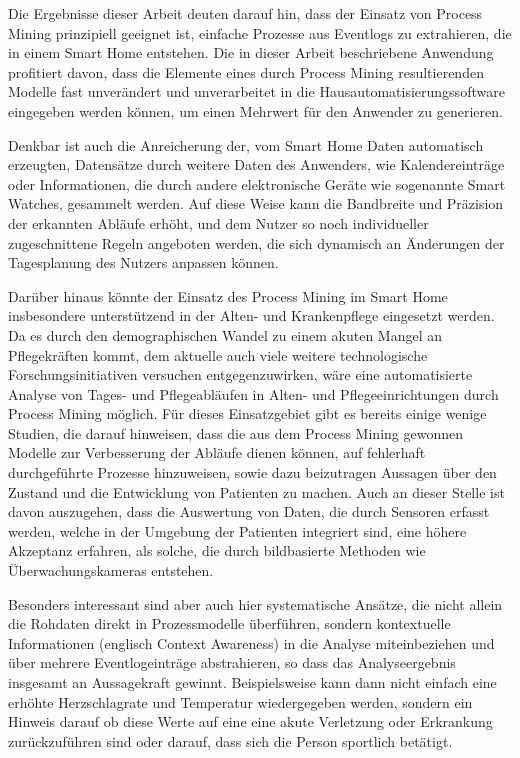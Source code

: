 Die Ergebnisse dieser Arbeit deuten darauf hin, dass der Einsatz von Process Mining prinzipiell geeignet ist, einfache Prozesse aus Eventlogs zu extrahieren, die in einem Smart Home entstehen. Die in dieser Arbeit beschriebene Anwendung profitiert davon, dass die Elemente eines durch Process Mining resultierenden Modelle fast unverändert und unverarbeitet in die Hausautomatisierungssoftware eingegeben werden können, um einen Mehrwert für den Anwender zu generieren. 

Denkbar ist auch die Anreicherung der, vom Smart Home Daten automatisch erzeugten, Datensätze durch weitere Daten des Anwenders, wie Kalendereinträge oder Informationen, die durch andere elektronische Geräte wie sogenannte Smart Watches, gesammelt werden. Auf diese Weise kann die Bandbreite und Präzision der erkannten Abläufe erhöht, und dem Nutzer so noch individueller zugeschnittene Regeln angeboten werden, die sich dynamisch an Änderungen der Tagesplanung des Nutzers anpassen können.

Darüber hinaus könnte der Einsatz des Process Mining im Smart Home insbesondere unterstützend in der Alten- und Krankenpflege eingesetzt werden. Da es durch den demographischen Wandel zu einem akuten Mangel an Pflegekräften kommt, dem aktuelle auch viele weitere technologische Forschungsinitiativen versuchen entgegenzuwirken, wäre eine automatisierte Analyse von Tages- und Pflegeabläufen in Alten- und Pflegeeinrichtungen durch Process Mining möglich. Für dieses Einsatzgebiet gibt es bereits einige wenige Studien, die darauf hinweisen, dass die aus dem Process Mining gewonnen Modelle zur Verbesserung der Abläufe dienen können, auf fehlerhaft durchgeführte Prozesse hinzuweisen, sowie dazu beizutragen Aussagen über den Zustand und die Entwicklung von Patienten zu machen. Auch an dieser Stelle ist davon auszugehen, dass die Auswertung von Daten, die durch Sensoren erfasst werden, welche in der Umgebung der Patienten integriert sind, eine höhere Akzeptanz erfahren, als solche, die durch bildbasierte Methoden wie Überwachungskameras entstehen.

Besonders interessant sind aber auch hier systematische Ansätze, die nicht allein die Rohdaten direkt in Prozessmodelle überführen, sondern kontextuelle Informationen (englisch Context Awareness) in die Analyse miteinbeziehen und über mehrere Eventlogeinträge abstrahieren, so dass das Analyseergebnis insgesamt an Aussagekraft gewinnt.
Beispielsweise kann dann nicht einfach eine erhöhte Herzschlagrate und Temperatur wiedergegeben werden, sondern ein Hinweis darauf ob diese Werte auf eine eine akute Verletzung oder Erkrankung zurückzuführen sind oder darauf, dass sich die Person sportlich betätigt. 

